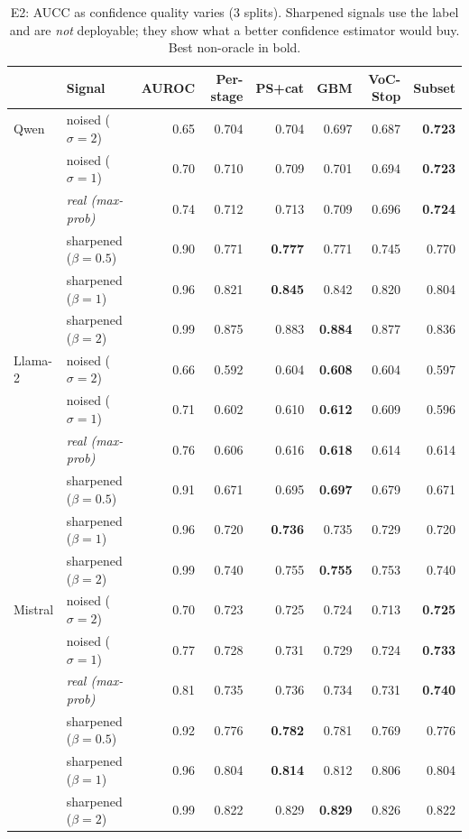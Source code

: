 \begin{table}[t]\centering\small
\caption{E2: AUCC as confidence quality varies (3 splits). Sharpened signals use the label and are \emph{not} deployable; they show what a better confidence estimator would buy. Best non-oracle in bold.}
\label{tab:conf}
\begin{tabular}{llrrrrrr}\toprule
 & Signal & AUROC & Per-stage & PS+cat & GBM & VoC-Stop & Subset\\\midrule
Qwen & noised ($\sigma{=}2$) & 0.65 & 0.704 & 0.704 & 0.697 & 0.687 & \textbf{0.723}\\
 & noised ($\sigma{=}1$) & 0.70 & 0.710 & 0.709 & 0.701 & 0.694 & \textbf{0.723}\\
 & \textit{real (max-prob)} & 0.74 & 0.712 & 0.713 & 0.709 & 0.696 & \textbf{0.724}\\
 & sharpened ($\beta{=}0.5$) & 0.90 & 0.771 & \textbf{0.777} & 0.771 & 0.745 & 0.770\\
 & sharpened ($\beta{=}1$) & 0.96 & 0.821 & \textbf{0.845} & 0.842 & 0.820 & 0.804\\
 & sharpened ($\beta{=}2$) & 0.99 & 0.875 & 0.883 & \textbf{0.884} & 0.877 & 0.836\\
\midrule
Llama-2 & noised ($\sigma{=}2$) & 0.66 & 0.592 & 0.604 & \textbf{0.608} & 0.604 & 0.597\\
 & noised ($\sigma{=}1$) & 0.71 & 0.602 & 0.610 & \textbf{0.612} & 0.609 & 0.596\\
 & \textit{real (max-prob)} & 0.76 & 0.606 & 0.616 & \textbf{0.618} & 0.614 & 0.614\\
 & sharpened ($\beta{=}0.5$) & 0.91 & 0.671 & 0.695 & \textbf{0.697} & 0.679 & 0.671\\
 & sharpened ($\beta{=}1$) & 0.96 & 0.720 & \textbf{0.736} & 0.735 & 0.729 & 0.720\\
 & sharpened ($\beta{=}2$) & 0.99 & 0.740 & 0.755 & \textbf{0.755} & 0.753 & 0.740\\
\midrule
Mistral & noised ($\sigma{=}2$) & 0.70 & 0.723 & 0.725 & 0.724 & 0.713 & \textbf{0.725}\\
 & noised ($\sigma{=}1$) & 0.77 & 0.728 & 0.731 & 0.729 & 0.724 & \textbf{0.733}\\
 & \textit{real (max-prob)} & 0.81 & 0.735 & 0.736 & 0.734 & 0.731 & \textbf{0.740}\\
 & sharpened ($\beta{=}0.5$) & 0.92 & 0.776 & \textbf{0.782} & 0.781 & 0.769 & 0.776\\
 & sharpened ($\beta{=}1$) & 0.96 & 0.804 & \textbf{0.814} & 0.812 & 0.806 & 0.804\\
 & sharpened ($\beta{=}2$) & 0.99 & 0.822 & 0.829 & \textbf{0.829} & 0.826 & 0.822\\
\bottomrule\end{tabular}
\end{table}
